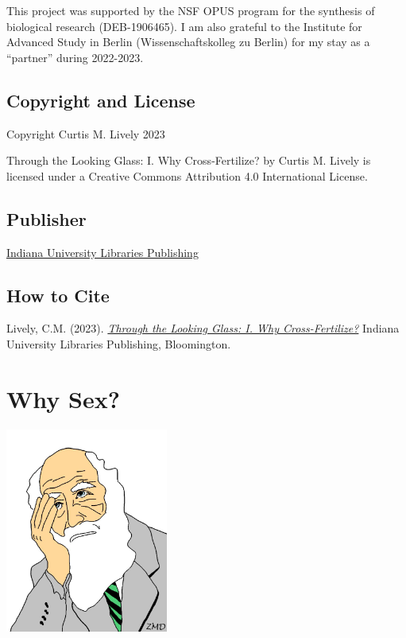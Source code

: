 \documentclass[
  letterpaper,
]{book}
\begin{document}
This project was supported by the NSF OPUS program for the synthesis of
biological research (DEB-1906465). I am also grateful to the Institute
for Advanced Study in Berlin (Wissenschaftskolleg zu Berlin) for my stay
as a ``partner'' during 2022-2023.

\section*{Copyright and License}\label{copyright-and-license}


Copyright Curtis M. Lively 2023

{Through the Looking Glass: I. Why Cross-Fertilize?} by Curtis M. Lively
is licensed under a Creative Commons Attribution 4.0 International
License.

\section*{Publisher}\label{publisher}


\href{https://libraries.indiana.edu/scholarly-communication}{Indiana
University Libraries Publishing}

\section*{How to Cite}\label{how-to-cite}


Lively, C.M. (2023).
\href{https://doi.org/10.5967/GBD3-KA07}{\emph{Through the Looking
Glass: I. Why Cross-Fertilize?}} Indiana University Libraries
Publishing, Bloomington.


\chapter{Why Sex?}\label{sec-why-sex}

\begin{center}
\includegraphics[width=0.4\textwidth,height=\textheight]{images/fig1-1.png}
\end{center}
\end{document}

